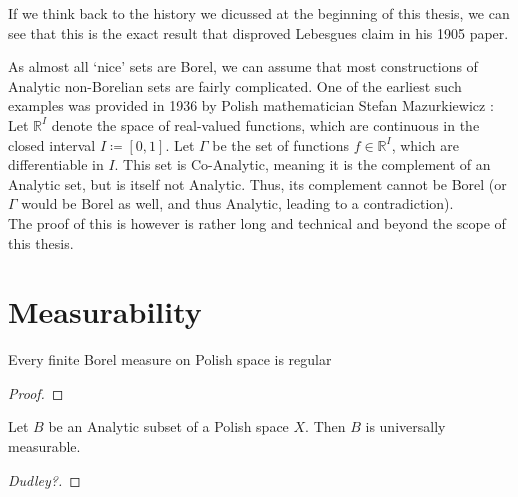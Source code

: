 \documentclass[10pt, a4paper, titlepage]{article}
\numberwithin{equation}{section}
\begin{document}
If we think back to the history we dicussed at the beginning of this thesis, we
can see that this is the exact result that disproved Lebesgues claim in his 1905
paper.
\begin{example}
	As almost all `nice' sets are Borel, we can assume that most constructions of Analytic non-Borelian sets are fairly complicated. 
	One of the earliest such examples was provided in 1936 by Polish mathematician Stefan Mazurkiewicz \cite{mazurkiewicz1936}:\\
	Let $\mathbb{R}^I$ denote the space of real-valued functions, which are continuous in the closed interval $I \coloneq[0,1]$. Let  $\Gamma$ be the set of functions  $f \in \mathbb{R}^I$, which are differentiable in $I$. This set is Co-Analytic, meaning it is the complement of an Analytic set, but is itself not Analytic. 
	Thus, its complement cannot be Borel (or $\Gamma$ would be Borel as well, and thus Analytic, leading to a contradiction). \\
	The proof of this is however is rather long and technical and beyond the scope of this thesis.
	
\end{example}



\section{Measurability}

\begin{definition}[$\mu$-Measurable]
	
\end{definition}

\begin{definition}
	
\end{definition}

\begin{theorem}
	Every finite Borel measure on Polish space is regular
\end{theorem}
\begin{proof}
	
\end{proof}
\begin{theorem}
	Let $B$ be an Analytic subset of a Polish space $X$. Then $B$ is universally measurable.
\end{theorem}
\begin{proof}
	[Dudley?] 
\end{proof}
\end{document}
